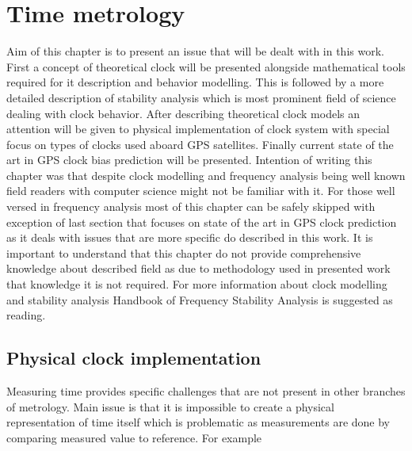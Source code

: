 \chapter{Time metrology}
Aim of this chapter is to present an issue that will be dealt with in this work.
First a concept of theoretical clock will be presented alongside mathematical tools required
for it description and behavior modelling.
This is followed by a more detailed description of stability analysis which is most prominent
field of science dealing with clock behavior.
After describing theoretical clock models an attention will be given to physical implementation
of clock system with special focus on types of clocks used aboard GPS satellites.
Finally current state of the art in GPS clock bias prediction will be presented.
Intention of writing this chapter was that despite clock modelling and frequency analysis being
well known field readers with computer science might not be familiar with it.
For those well versed in frequency analysis most of this chapter can be safely skipped with 
exception of last section that focuses on state of the art in GPS clock prediction as it 
deals with issues that are more specific do described in this work.
It is important to understand that this chapter do not provide comprehensive knowledge about
described field as due to methodology used in presented work that knowledge it is not required.
For more information about clock modelling and stability analysis Handbook of Frequency Stability
Analysis is suggested as reading.


\section{Physical clock implementation}
\label{sec:physical_clock}
Measuring time provides specific challenges that are not present in other branches of 
metrology. Main issue is that it is impossible to create a physical representation of time 
itself which is problematic as measurements are done by comparing measured value to reference.
For example

